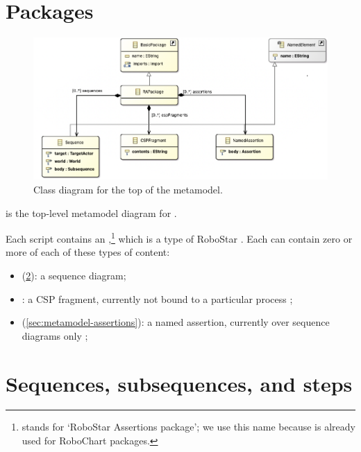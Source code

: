 
\section{Packages}\label{sec:metamodel-top}

\begin{figure}
	\centering
	\includegraphics[width=.8\textwidth]{diagrams/top.png}
	\caption{Class diagram for the top of the \langname{} metamodel.}
	\label{fig:metamodel-top}
\end{figure}

 is the top-level metamodel diagram for \langname.

Each \langname{} script contains an \mrapackage,\footnote{\mrapackage{} stands
for `RoboStar Assertions package'; we use this name because \mrcpackage{} is
already used for RoboChart packages.}
which is a type of RoboStar \mbasicpackage.
Each \mrapackage{} can contain zero or more of each of these types of content:

\begin{itemize}
\item
	\msequence{}
	(\cref{sec:metamodel-sequences}):
	a sequence diagram;
\item
	\mcspfragment:
	a CSP fragment, currently not bound to a particular process
	;
\item
	\mnamedassertion{}
	(\cref{sec:metamodel-assertions}):
	a named assertion, currently over sequence diagrams only
	;
\end{itemize}



\section{Sequences, subsequences, and steps}\label{sec:metamodel-sequences}

